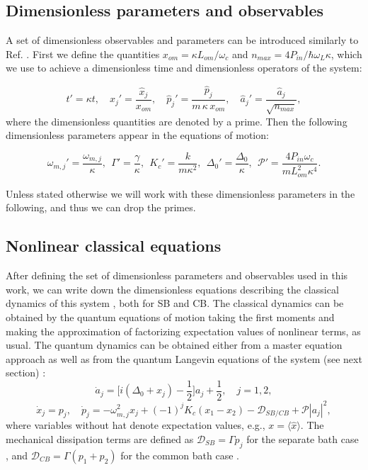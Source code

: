 \documentclass[a4paper]{jpconf}
\begin{document}
\subsection{Dimensionless parameters and observables}
\label{sect2.2}
 A set of 
dimensionless observables and parameters can be introduced similarly to 
Ref. \cite{6}. First we define the quantities 
$x_{om}=\kappa L_{om}/\omega_c$ and $n_{max}=4 
P_{in}/\hbar\omega_L\kappa$, which we use to achieve a dimensionless time and dimensionless operators of the system:

\begin{equation}
t'=\kappa t,\quad \hat{x}_j'=\frac{\hat{x}_j}{x_{om}},\quad 
\hat{p}_j'=\frac{\hat{p}_j}{m\,\kappa\, x_{om}}, \quad 
\hat{a}_j'=\frac{\hat{a}_j}{\sqrt{n_{max}}}, 
\end{equation}
where the dimensionless quantities are  denoted by a prime. 
Then the following dimensionless parameters appear in the equations of motion: 

\begin{equation}
\omega_{m,j}'=\frac{\omega_{m,j}}{\kappa},\ \ \Gamma'=\frac{\gamma}{\kappa},\ \ K_c'= 
\frac{k}{m\kappa^2},\ \ \Delta_0'=\frac{\Delta_0}{\kappa},\ \ \mathcal{P}'=\frac{4P_{in}\omega_c}{mL_{om}^2\kappa^4}.
\end{equation}

 Unless stated otherwise we will work with these dimensionless parameters in the following, and thus we can drop the primes.

\subsection{Nonlinear classical equations}

After defining the set of dimensionless parameters and observables used in this work, we can write down the dimensionless equations describing the classical
dynamics of this system \cite{9}, both for SB and CB.
The classical dynamics  can be obtained by the quantum equations of motion taking the first moments
and making the approximation of factorizing expectation values of nonlinear terms, as usual. The quantum dynamics 
can be obtained either from a master equation approach as well as from the quantum Langevin equations of the system (see next section) \cite{1,44,45}:
\begin{equation}\label{cl1}
\dot{a}_j=\bigg[i(\Delta_0+x_j)-\frac{1}{2} \bigg]a_j+\frac{1}{2},\quad j=1,2,
\end{equation}
\begin{equation}\label{cl2}
\dot{x}_j=p_j,\quad 
\dot{p}_j=-\omega^2_{m,j}x_j+(-1)^{j}K_c(x_1-x_2)-\mathcal{D}_{SB/CB}+\mathcal{P
}|a_j|^2,
\end{equation}
where  variables without hat denote expectation values, e.g., $x=\langle\hat{x}\rangle$. The mechanical dissipation terms are defined as 
$\mathcal{D}_{SB}=\Gamma p_j$ for the separate bath case \cite{9}, and 
$\mathcal{D}_{CB}=\Gamma(p_1+p_2)$ for the common bath case \cite{45}. 
\end{document}
